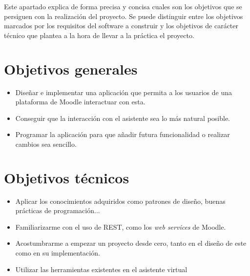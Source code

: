 
Este apartado explica de forma precisa y concisa cuales son los objetivos que se persiguen con la realización del proyecto. Se puede distinguir entre los objetivos marcados por los requisitos del software a construir y los objetivos de carácter técnico que plantea a la hora de llevar a la práctica el proyecto.

\section{Objetivos generales}

\begin{itemize}
	\item Diseñar e implementar una aplicación que permita a los usuarios de una plataforma de Moodle interactuar con esta.
	\item Conseguir que la interacción con el asistente sea lo más natural posible.
	\item Programar la aplicación para que añadir futura funcionalidad o realizar cambios sea sencillo.
\end{itemize}

\section{Objetivos técnicos}

\begin{itemize}
	\item Aplicar los conocimientos adquiridos como patrones de diseño, buenas prácticas de programación...
	\item Familiarizarme con el uso de REST, como los \textit{web services} de Moodle.
	\item Acostumbrarme a empezar un proyecto desde cero, tanto en el diseño de este como en su implementación.
	\item Utilizar las herramientas existentes en el asistente virtual
\end{itemize}